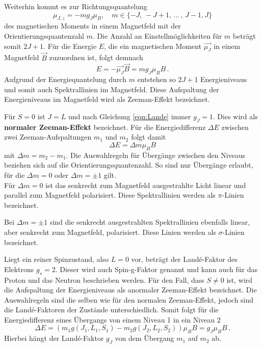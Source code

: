Weiterhin kommt es zur Richtungsquantelung
\begin{equation*}
  \mu_{J,z} = −m g_J \mu_B, \quad m \in \{ -J,\, -J+1, \, ... \, ,\, J-1, J \}
\end{equation*}
des magnetischen Moments in einem Magnetfeld mit der Orientierungsquantenzahl $m$.
Die Anzahl an Einstellmöglichkeiten für $m$ beträgt somit $2J+1$.
Für die Energie $E$, die ein magnetischen Moment $\vec{\mu_J}$ in einem Magnetfeld $\vec{B}$ zuzuordnen ist, folgt demnach
\begin{equation} \label{eqn:Melinaistdoof}
  E = -\vec{\mu_J} \vec{B} = m g_J \mu_B B \, .
\end{equation}
Aufgrund der Energiequantelung durch $m$ entstehen so $2J+1$  Energieniveaus und somit auch Spektrallinien im Magnetfeld.
Diese Aufspaltung der Energieniveaus im Magnetfeld wird als Zeeman-Effekt bezeichnet.

Für $S=0$ ist $J=L$ und nach Gleichung \eqref{eqn:Lande} immer $g_J = 1$.
Dies wird als \textbf{normaler Zeeman-Effekt} bezeichnet.
Für die Energiedifferenz $\Delta E$ zwischen zwei Zeeman-Aufspaltungen $m_1$ und $m_2$ folgt damit
\begin{equation} \label{egn:E_normal}
  \Delta E = \Delta m \mu_B B
\end{equation}
mit $\Delta m  = m_2 - m_1$.
Die Auswahlregeln für Übergänge zwischen den Niveaus beziehen sich auf die Orientierungsquantenzahl.
So sind nur Übergänge erlaubt, für die $\Delta m = 0$ oder $\Delta m = \pm 1$ gilt. \\
Für $\Delta m = 0$ ist das senkrecht zum Magnetfeld ausgestrahlte Licht linear und parallel zum Magnetfeld polarisiert.
Diese Spektrallinien werden als $\pi$-Linien bezeichnet.
\par\medskip
Bei $\Delta m = \pm1$ sind die senkrecht ausgestrahlten Spektrallinien ebenfalls linear, aber senkrecht zum Magnetfeld, polarisiert.
Diese Linien werden als $\sigma$-Linien bezeichnet.

\par\bigskip
Liegt ein reiner Spinzustand, also $L = 0$ vor, beträgt der Landé-Faktor des Elektrons $g_s =2 $. Dieser wird auch Spin-g-Faktor genannt und kann auch für das Proton und das Neutron beschrieben werden.
Für den Fall, dass $S \neq 0$ ist, wird die Aufspaltung der Energieniveaus als anormaler Zeeman-Effekt bezeichnet.
Die Auswahlregeln sind die selben wie für den normalen Zeeman-Effekt, jedoch sind die Landé-Faktoren der Zustände unterschiedlich.
Somit folgt für die Energiedifferenz eines Übergangs von einem Niveau 1 in ein Niveau 2
\begin{equation} \label{eqn:an_zeeman}
  \Delta E = \left( m_1 g\left(J_1,L_1,S_1\right) - m_2 g\left(J_2,L_2,S_2\right) \right) \mu_B B = g_J \mu_B B \, .
\end{equation}
Hierbei hängt der Landé-Faktor $g_J$ von dem Übergang $m_1$ auf $m_2$ ab.
